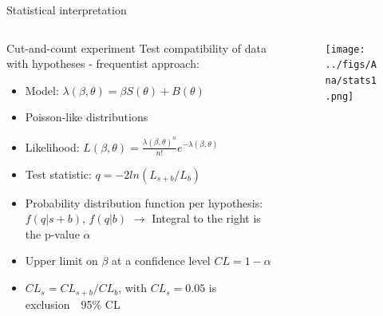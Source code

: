 \begin{frame}{Statistical interpretation}
\vspace{-.6cm}
\begin{columns}
\begin{column}{.50\textwidth}\tiny
\begin{block}{\scriptsize{Cut-and-count experiment}}\tiny
Test compatibility of data with hypotheses - frequentist approach:
\begin{itemize}
\item Model: ${\lambda(\beta,\theta)=\beta S(\theta)+B(\theta)}$
\item Poisson-like distributions
\item Likelihood: $L(\beta,\theta)=\frac{\lambda(\beta,\theta)^{n}}{n!}e^{-\lambda(\beta,\theta)}$
\item Test statistic: $q=-2ln(L_{s+b}/L_{b})$
\item Probability distribution function per hypothesis: $f(q|s+b)$, $f(q|b)$ $\to$ Integral to the right is the p-value $\alpha$
\item Upper limit on $\beta$ at a confidence level $CL=1-\alpha$ 
\item $CL_{s}=CL_{s+b}/CL_{b}$, with $CL_{s}=0.05$ is exclusion~\MVAt~95\% CL 
\end{itemize}
\end{block}
\end{column}

\begin{column}{.50\textwidth}\tiny
\begin{figure}[!Hhtbp]
  \begin{center}
    \texttt{[image: ../figs/Ana/stats1.png]}
  \end{center}
\end{figure}
\end{column}

\end{columns}

\end{frame}

